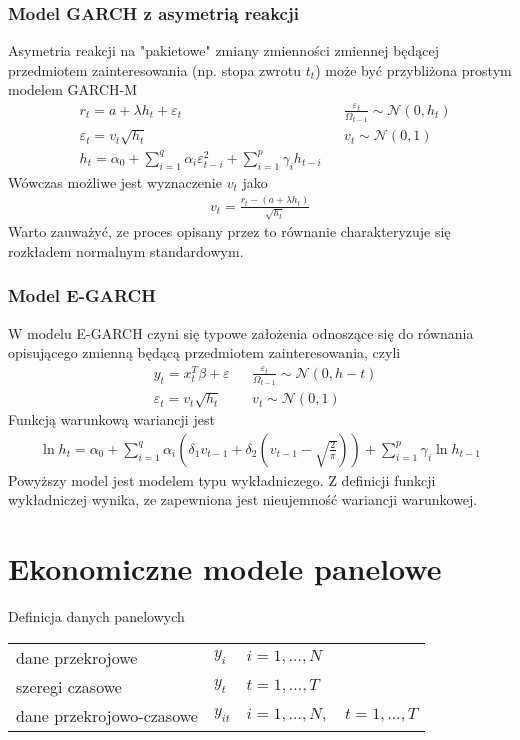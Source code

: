 \subsubsection{Model GARCH z asymetrią reakcji}
Asymetria reakcji na "pakietowe" zmiany zmienności zmiennej będącej przedmiotem zainteresowania (np. stopa zwrotu $ t_t $) może być przybliżona prostym modelem GARCH-M
\begin{align*}
&r_t=a+\lambda h_t+\varepsilon_t
&&
\frac{\varepsilon_t}{\Omega_{t-1}}\sim \mathcal N(0,h_t)\\
&\varepsilon_t=v_t\sqrt{h_t}
&&
v_t\sim\mathcal N(0,1)\\
&h_t=\alpha_0+\sum_{i=1}^{q}\alpha_i\varepsilon_{t-i}^2+\sum_{i=1}^{p}\gamma_ih_{t-i}
\end{align*}
Wówczas możliwe jest wyznaczenie $ v_t $ jako
\begin{gather*}
v_t=\frac{r_t-\left(a+\lambda h_t\right)}{\sqrt{h_t}}
\end{gather*}
Warto zauważyć, ze proces opisany przez to równanie charakteryzuje się rozkładem normalnym standardowym.
\subsubsection{Model E-GARCH}
W modelu E-GARCH czyni się typowe założenia odnoszące się do równania opisującego zmienną będącą przedmiotem zainteresowania, czyli
\begin{align*}
&y_t=x_t^T\beta+\varepsilon&&\frac{\varepsilon_t}{\Omega_{t-1}}\sim\mathcal N(0,h-t)\\
&\varepsilon_t=v_t\sqrt{h_t}&&v_t\sim\mathcal N(0,1)
\end{align*}
Funkcją warunkową wariancji jest
\begin{gather*}
\ln h_t=\alpha_0+\sum_{i=1}^{q}\alpha_i\left(\delta_1v_{t-1}+\delta_2\left(v_{t-1}-\sqrt{\frac{2}{\pi}}\right)\right)+\sum_{i=1}^{p}\gamma_i\ln h_{t-1}
\end{gather*}
Powyższy model jest modelem typu wykładniczego. Z definicji funkcji wykładniczej wynika, ze zapewniona jest nieujemność wariancji warunkowej.

\section{Ekonomiczne modele panelowe}
Definicja danych panelowych\\
\begin{tabular}{lll}
	dane przekrojowe         & $ y_i $    & $ i=1,\dots,N $                  \\
	szeregi czasowe          & $ y_t $    & $ t=1,\dots,T $                  \\
	dane przekrojowo-czasowe & $ y_{it} $ & $ i=1,\dots,N,\quad t=1,\dots,T$
\end{tabular}

